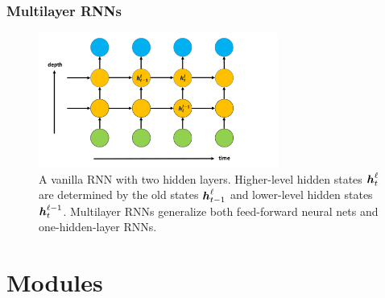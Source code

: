 \documentclass[presentation]{beamer}
\begin{document}
\begin{frame}
    \frametitle{Multilayer RNNs}
    \begin{figure}
        \centering
        \includegraphics[width = 0.7\textwidth]{RNN2}
        \caption{A vanilla RNN with two hidden layers. Higher-level hidden states $\text{\boldmath $h$}_t^{\ell}$ are determined by the old states $\text{\boldmath $h$}_{t-1}^\ell$ and lower-level hidden states $\text{\boldmath $h$}_t^{\ell-1}$. Multilayer RNNs generalize both feed-forward neural nets and one-hidden-layer RNNs.}\label{fig:RNN2}
    \end{figure}

\end{frame}


\section{Modules}
\end{document}
